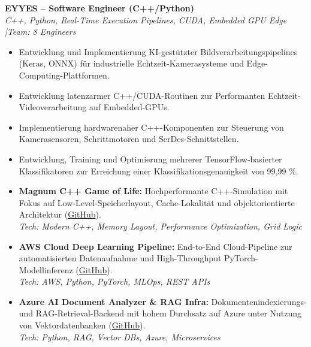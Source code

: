 \documentclass[10pt,a4paper]{article}
\begin{document}
\vspace{0.15cm}
\textbf{EYYES -- Software Engineer (C++/Python)} \\
\textit{C++, Python, Real-Time Execution Pipelines, CUDA, Embedded GPU Edge \quad|\quad Team: 8 Engineers}
\begin{itemize}
    \item Entwicklung und Implementierung KI-gestützter Bildverarbeitungspipelines (Keras, ONNX) für industrielle Echtzeit-Kamerasysteme und Edge-Computing-Plattformen.
    \item Entwicklung latenzarmer C++/CUDA-Routinen zur Performanten Echtzeit-Videoverarbeitung auf Embedded-GPUs.
    \item Implementierung hardwarenaher C++-Komponenten zur Steuerung von Kamerasensoren, Schrittmotoren und SerDes-Schnittstellen.
    \item Entwicklung, Training und Optimierung mehrerer TensorFlow-basierter Klassifikatoren zur Erreichung einer Klassifikationsgenauigkeit von 99,99 \%.
\end{itemize}


\begin{itemize}[leftmargin=1.5em, itemsep=0.2em]
    \item \textbf{Magnum C++ Game of Life:} Hochperformante C++-Simulation mit Fokus auf Low-Level-Speicherlayout, Cache-Lokalität und objektorientierte Architektur (\href{https://github.com/CodeByMaxx/magnum-game-of-life}{GitHub}).\\
    \textit{Tech: Modern C++, Memory Layout, Performance Optimization, Grid Logic}
    \item \textbf{AWS Cloud Deep Learning Pipeline:} End-to-End Cloud-Pipeline zur automatisierten Datenaufnahme und High-Throughput PyTorch-Modellinferenz (\href{https://github.com/CodeByMaxx/aws-pneumonia-detection}{GitHub}).\\
    \textit{Tech: AWS, Python, PyTorch, MLOps, REST APIs}
    \item \textbf{Azure AI Document Analyzer \& RAG Infra:} Dokumentenindexierungs- und RAG-Retrieval-Backend mit hohem Durchsatz auf Azure unter Nutzung von Vektordatenbanken (\href{https://github.com/CodeByMaxx/AI-Document-Analyzer}{GitHub}).\\
    \textit{Tech: Python, RAG, Vector DBs, Azure, Microservices}
\end{itemize}

\end{document}
